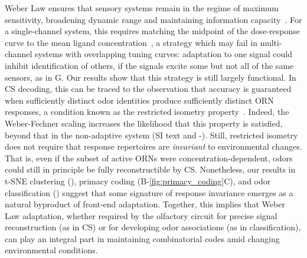 \documentclass[9pt,lineno]{elife}
\begin{document}
Weber Law ensures that sensory systems remain in the regime of maximum sensitivity, broadening dynamic range and maintaining information capacity~\citep{adaptation_fairhall}.
For a single-channel system, this requires matching the midpoint of the dose-response curve to the mean ligand concentration~\citep{information_theory_adaptation}, a strategy which may fail in multi-channel systems with overlapping tuning curves: adaptation to one signal could inhibit identification of others, if the signals excite some but not all of the same sensors, as in G. 
Our results show that this strategy is still largely functional. In CS decoding, this can be traced to the observation that accuracy is guaranteed when sufficiently distinct odor identities produce sufficiently distinct ORN responses, a condition known as the restricted isometry property~\citep{CS_tao}. Indeed, the Weber-Fechner scaling increases the likelihood that this property  is satisfied, beyond that in the non-adaptive system (SI text and -). Still, restricted isometry does not require that response repertoires are \textit{invariant} to environmental changes. That is, even if the subset of active ORNs were concentration-dependent, odors could still in principle be fully reconstructible by CS.
Nonetheless, our results in t-SNE clustering (), primacy coding  (B-\ref{fig:primacy_coding}C), and odor classification () suggest that some signature of response invariance emerges as a natural byproduct of front-end adaptation. Together, this implies that Weber Law adaptation, whether required by the olfactory circuit for precise signal reconstruction (as in CS) or for developing odor associations (as in classification), can play an integral part in maintaining combinatorial codes amid changing environmental conditions.

\end{document}
